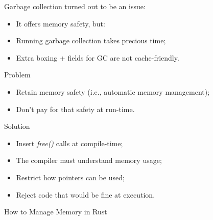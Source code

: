 \documentclass[9pt]{beamer}
\renewcommand\big[1]{
  \begin{center}
    \Large{#1}
  \end{center}
}
\begin{document}
\begin{frame}
  \big{Garbage collection turned out to be an issue:}
  \begin{itemize}
    \item It offers memory safety, but:
    \item Running garbage collection takes precious time;
    \item Extra boxing + fields for GC are not cache-friendly.
  \end{itemize}
\end{frame}

\begin{frame}
  \big{Problem}
  \begin{itemize}
    \item Retain memory safety (i.e., automatic memory management);
    \item Don't pay for that safety at run-time.
  \end{itemize}
\end{frame}

\begin{frame}
  \big{Solution}
  \begin{itemize}
    \item Insert \emph{free()} calls at compile-time;
    \item The compiler must understand memory usage;
    \item Restrict how pointers can be used;
    \item Reject code that would be fine at execution.
  \end{itemize}
\end{frame}

\begin{frame}
\end{frame}


\begin{frame}
  \centering\Huge{How to Manage Memory in Rust}
\end{frame}
\end{document}
